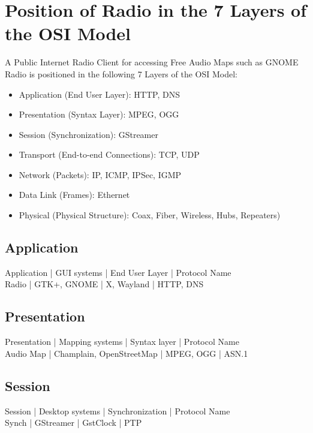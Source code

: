 \documentclass[a4paper,norsk,utf8]{report}
\begin{document}
\chapter{Position of Radio in the 7 Layers of the OSI Model}

    A Public Internet Radio Client for accessing Free Audio Maps such
    as GNOME Radio is positioned in the following 7 Layers of the OSI
    Model:

    \begin{itemize}
    \item Application (End User Layer): HTTP, DNS
    \item Presentation (Syntax Layer): MPEG, OGG
    \item Session (Synchronization): GStreamer
    \item Transport (End-to-end Connections): TCP, UDP
    \item Network (Packets): IP, ICMP, IPSec, IGMP
    \item Data Link (Frames): Ethernet
    \item Physical (Physical Structure): Coax, Fiber, Wireless, Hubs, Repeaters)
    \end{itemize}

\section{Application}

    Application | GUI systems | End User Layer | Protocol Name\\
    Radio | GTK+, GNOME | X, Wayland | HTTP, DNS\\

\section{Presentation}

    Presentation | Mapping systems | Syntax layer | Protocol Name\\
    Audio Map | Champlain, OpenStreetMap | MPEG, OGG | ASN.1\\

\section{Session}

    Session | Desktop systems | Synchronization | Protocol Name\\
    Synch | GStreamer | GstClock | PTP\\
\end{document}
